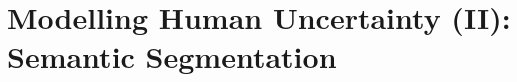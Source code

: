\chapter{Modelling Human Uncertainty (II): Semantic Segmentation} \label{chapter:humanuncertainty_seg}

%



